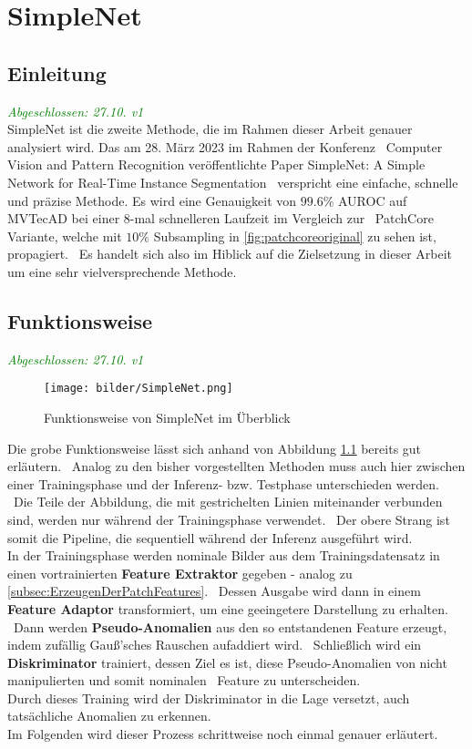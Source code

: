 
\chapter{SimpleNet}\label{ch:SimpleNet}
\section{Einleitung}\label{sec:SimpleNet-Einleitung}
\textcolor{green}{\textit{Abgeschlossen: 27.10. v1}}\\
SimpleNet ist die zweite Methode, die im Rahmen dieser Arbeit genauer analysiert wird. Das am 28. März 2023 im Rahmen der Konferenz \ 
\glqq Computer Vision and Pattern Recognition\grqq{} veröffentlichte Paper \glqq SimpleNet: A Simple Network for Real-Time Instance Segmentation\grqq{} \
verspricht eine einfache, schnelle und präzise Methode. Es wird eine Genauigkeit von $\num{99,6}$\% AUROC auf MVTecAD bei einer 8-mal schnelleren Laufzeit im Vergleich zur \
PatchCore Variante, welche mit $\num{10}\%$ Subsampling in \ref{fig:patchcoreoriginal} zu sehen ist, propagiert. \ 
Es handelt sich also im Hiblick auf die Zielsetzung in dieser Arbeit um eine sehr vielversprechende Methode. \
\section{Funktionsweise}\label{sec:SimpleNet-Funktionsweise}
\textcolor{green}{\textit{Abgeschlossen: 27.10. v1}}\\
\begin{figure}[H]
    \centering
    \texttt{[image: bilder/SimpleNet.png]}
    \caption{Funktionsweise von SimpleNet im Überblick \cite{SimpleNet}}
    \label{fig:simplenet}
\end{figure}
Die grobe Funktionsweise lässt sich anhand von Abbildung \ref{fig:simplenet} bereits gut erläutern. \
Analog zu den bisher vorgestellten Methoden muss auch hier zwischen einer Trainingsphase und der Inferenz- bzw. Testphase unterschieden werden. \
Die Teile der Abbildung, die mit gestrichelten Linien miteinander verbunden sind, werden nur während der Trainingsphase verwendet. \ 
Der obere Strang ist somit die Pipeline, die sequentiell während der Inferenz ausgeführt wird. \\
In der Trainingsphase werden nominale Bilder aus dem Trainingsdatensatz in einen vortrainierten \textbf{Feature Extraktor} gegeben - analog zu \ref{subsec:ErzeugenDerPatchFeatures}. \
Dessen Ausgabe wird dann in einem \textbf{Feature Adaptor} transformiert, um eine geeingetere Darstellung zu erhalten. \
Dann werden \textbf{Pseudo-Anomalien} aus den so entstandenen Feature erzeugt, indem zufällig Gauß'sches Rauschen aufaddiert wird. \
Schließlich wird ein \textbf{Diskriminator} trainiert, dessen Ziel es ist, diese Pseudo-Anomalien von nicht manipulierten und somit nominalen \
Feature zu unterscheiden. \\
Durch dieses Training wird der Diskriminator in die Lage versetzt, auch tatsächliche Anomalien zu erkennen. \\
Im Folgenden wird dieser Prozess schrittweise noch einmal genauer erläutert. \\
